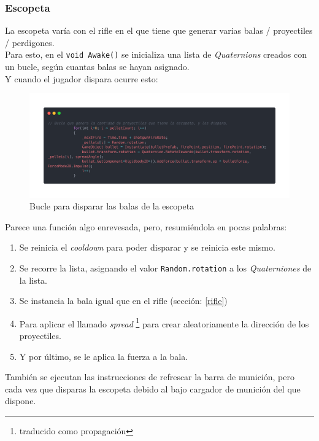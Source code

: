 \documentclass[12pt]{article}
\begin{document}
        \subsubsection{Escopeta} \label{escopeta}
            La escopeta varía con el rifle en el que tiene que generar varias balas / proyectiles / perdigones.\\

            Para esto, en el \texttt{void Awake()} se inicializa una lista de \textit{Quaternions} creados con un bucle, según cuantas balas se hayan asignado.\\ 

            Y cuando el jugador dispara ocurre esto:\\
            \begin{figure}[H]
                \centering
                \includegraphics[width=\textwidth]{Images/ShootyMacShooty/shootpelletes.png}
                \caption{Bucle para disparar las balas de la escopeta}
            \end{figure}
            Parece una función algo enrevesada, pero, resumiéndola en pocas palabras:
            \begin{enumerate}
                \item Se reinicia el \textit{cooldown} para poder disparar y se reinicia este mismo.
                \item Se recorre la lista, asignando el valor \texttt{Random.rotation} a los \textit{Quaterniones} de la lista.
                \item Se instancia la bala igual que en el rifle (sección: \ref*{rifle})
                \item Para aplicar el llamado \textit{spread} \footnote{traducido como propagación} para crear aleatoriamente la dirección de los proyectiles. 
                \item Y por último, se le aplica la fuerza a la bala.
            \end{enumerate}
            También se ejecutan las instrucciones de refrescar la barra de munición, pero cada vez que disparas la escopeta debido al bajo cargador de munición del que dispone. \\
            
\end{document}
